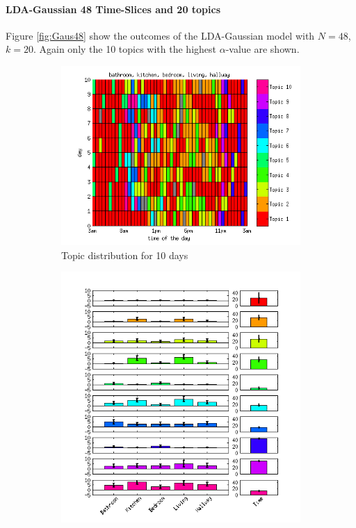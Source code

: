 \documentclass[11pt,a4paper]{article}
\begin{document}
\paragraph{LDA-Gaussian 48 Time-Slices and 20 topics}
Figure \ref{fig:Gaus48} show the outcomes of the LDA-Gaussian model with $N=48$, $k=20$. Again only the 10 topics with the highest $\alpha$-value are shown.

\begin{figure}[h!]
 \centering
 \begin{subfigure}[b]{0.45\linewidth}
  \centering
  \includegraphics[width=\textwidth]{Pictures/GausDayHN2TS48k20.png}
  \caption{Topic distribution for 10 days}
 \end{subfigure}
 \begin{subfigure}[b]{0.45\linewidth}
  \centering
  \includegraphics[width=\textwidth]{Pictures/GausTopHN2TS48k20.png}

\end{subfigure}
\end{figure}
\end{document}
